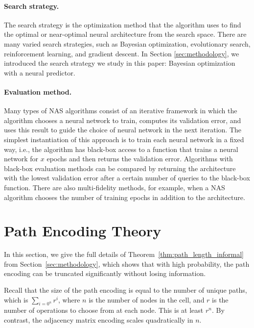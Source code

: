 \documentclass[11pt]{article}
\numberwithin{equation}{section}
\numberwithin{figure}{section}
\theoremstyle{plain}
\theoremstyle{definition}
\begin{document}
\paragraph{Search strategy.}
The search strategy is the optimization method that the algorithm uses to find the optimal or near-optimal neural architecture from the search space.
There are many varied search strategies, such as Bayesian optimization, evolutionary search, reinforcement learning, and gradient descent. 
In Section \ref{sec:methodology}, we introduced the search strategy we study in this
paper: Bayesian optimization with a neural predictor.

\paragraph{Evaluation method.}
Many types of NAS algorithms consist of an iterative framework in which the algorithm
chooses a neural network to train, computes its validation error, and uses this result
to guide the choice of neural network in the next iteration. The simplest instantiation
of this approach is to train each neural network in a fixed way, i.e., the algorithm
has black-box access to a function that trains a neural network for $x$ epochs and then
returns the validation error.
Algorithms with black-box
evaluation methods can be compared by returning the architecture with the lowest 
validation error after a certain number of queries to the black-box function. There
are also multi-fidelity methods, for example, when a NAS algorithm chooses the number of
training epochs in addition to the architecture.

 \section{Path Encoding Theory}\label{app:methodology}

In this section, we give the full details of Theorem~\ref{thm:path_length_informal}
from Section~\ref{sec:methodology}, which shows that with high probability, 
the path encoding can be truncated significantly without losing information.

Recall that the size of the path encoding is equal to the
number of unique paths, which is $\sum_{i=0^n}r^i$, where
$n$ is the number of nodes in the cell, and $r$ is the
number of operations to choose from at each node.
This is at least $r^n$.
By contrast, the adjacency matrix encoding scales quadratically
in $n$.
\end{document}
